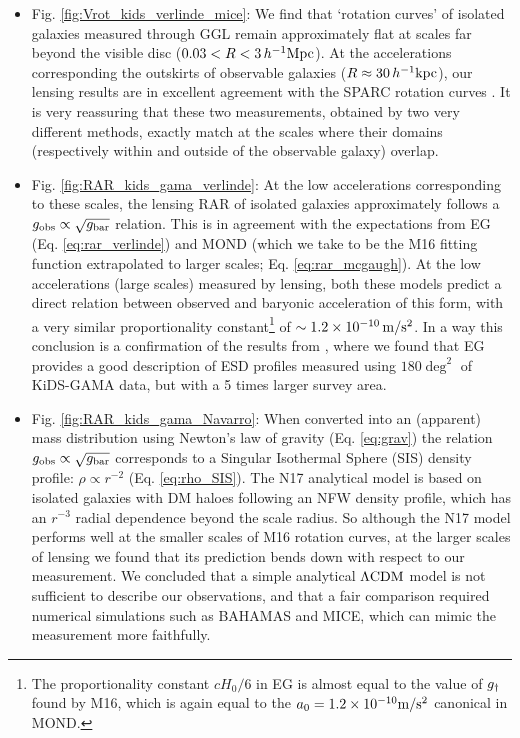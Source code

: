 \documentclass[usenatbib]{mnras}
\newcommand{\hkpc}{\, h^{-1}{\rm{kpc}} }
\newcommand{\hMpc}{\, h^{-1}{\rm{Mpc}} }
\newcommand{\mpss}{ {\rm m/s^2} }
\newcommand{\lcdm}{{\rm \Lambda CDM}}
\newcommand*{\E}[1]{\times 10^{#1}}
\newcommand{\un}[1]{_{\rm #1}}
\begin{document}
\begin{itemize}

	\item Fig. \ref{fig:Vrot_kids_verlinde_mice}: We find that `rotation curves' of isolated galaxies measured through GGL remain approximately flat at scales far beyond the visible disc ($0.03 < R < 3 \hMpc$). At the accelerations corresponding the outskirts of observable galaxies ($R \approx 30\hkpc$), our lensing results are in excellent agreement with the SPARC rotation curves \cite[]{lelli2016b}. It is very reassuring that these two measurements, obtained by two very different methods, exactly match at the scales where their domains (respectively within and outside of the observable galaxy) overlap.
	
	\item Fig. \ref{fig:RAR_kids_gama_verlinde}: At the low accelerations corresponding to these scales, the lensing RAR of isolated galaxies approximately follows a $g\un{obs} \propto \sqrt{g\un{bar}}$ relation. This is in agreement with the expectations from EG (Eq. \ref{eq:rar_verlinde}) and MOND (which we take to be the M16 fitting function extrapolated to larger scales; Eq. \ref{eq:rar_mcgaugh}). At the low accelerations (large scales) measured by lensing, both these models predict a direct relation between observed and baryonic acceleration of this form, with a very similar proportionality constant\footnote{The proportionality constant $c H_0 / 6$ in EG is almost equal to the value of $g\un{\dagger}$ found by M16, which is again equal to the $a_0=1.2\E{-10} \mpss$ canonical in MOND.} of $\sim1.2\E{-10} \, \mpss$. In a way this conclusion is a confirmation of the results from \cite{brouwer2017}, where we found that EG provides a good description of ESD profiles measured using $180 \deg^2$ of KiDS-GAMA data, but with a 5 times larger survey area.
	
	\item Fig. \ref{fig:RAR_kids_gama_Navarro}: When converted into an (apparent) mass distribution using Newton's law of gravity (Eq. \ref{eq:grav}) the relation $g\un{obs} \propto \sqrt{g\un{bar}}$ corresponds to a Singular Isothermal Sphere (SIS) density profile: $\rho \propto r^{-2}$ (Eq. \ref{eq:rho_SIS}). The N17 analytical model is based on isolated galaxies with DM haloes following an NFW density profile, which has an $r^{-3}$ radial dependence beyond the scale radius. So although the N17 model performs well at the smaller scales of M16 rotation curves, at the larger scales of lensing we found that its prediction bends down with respect to our measurement. We concluded that a simple analytical $\lcdm$ model is not sufficient to describe our observations, and that a fair comparison required numerical simulations such as BAHAMAS and MICE, which can mimic the measurement more faithfully.
	

\end{itemize}
\end{document}
